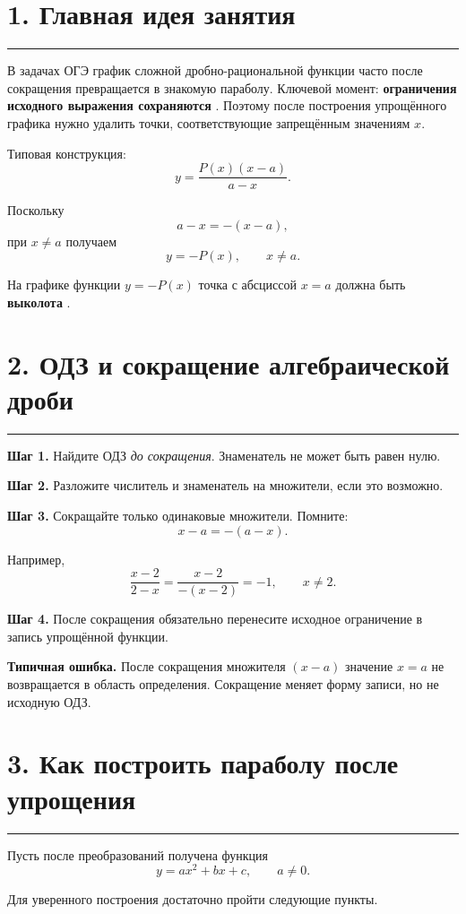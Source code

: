 \documentclass[a4paper,12pt]{article}
\newcommand{\sectionrule}{%
    \par
    \vspace{-0.4em}
    {\color{accent}\rule{\linewidth}{0.5pt}}
    \vspace{0.4em}
}
\newcommand{\key}[1]{%
    \textcolor{darkaccent}{\textbf{#1}}
}
\begin{document}
\section*{1. Главная идея занятия}
\sectionrule

В задачах ОГЭ график сложной дробно-рациональной функции часто после сокращения превращается в знакомую параболу. Ключевой момент: \key{ограничения исходного выражения сохраняются}. Поэтому после построения упрощённого графика нужно удалить точки, соответствующие запрещённым значениям $x$.

Типовая конструкция:
\[
y=\frac{P(x)(x-a)}{a-x}.
\]

Поскольку
\[
a-x=-(x-a),
\]
при $x\ne a$ получаем
\[
y=-P(x),
\qquad
x\ne a.
\]

На графике функции $y=-P(x)$ точка с абсциссой $x=a$ должна быть \key{выколота}.

\section*{2. ОДЗ и сокращение алгебраической дроби}
\sectionrule

\key{Шаг 1.} Найдите ОДЗ \emph{до сокращения}. Знаменатель не может быть равен нулю.

\key{Шаг 2.} Разложите числитель и знаменатель на множители, если это возможно.

\key{Шаг 3.} Сокращайте только одинаковые множители. Помните:
\[
x-a=-(a-x).
\]

Например,
\[
\frac{x-2}{2-x}
=
\frac{x-2}{-(x-2)}
=
-1,
\qquad
x\ne2.
\]

\key{Шаг 4.} После сокращения обязательно перенесите исходное ограничение в запись упрощённой функции.

\medskip

\textbf{Типичная ошибка.}
После сокращения множителя $(x-a)$ значение $x=a$ не возвращается в область определения. Сокращение меняет форму записи, но не исходную ОДЗ.

\section*{3. Как построить параболу после упрощения}
\sectionrule

Пусть после преобразований получена функция
\[
y=ax^2+bx+c,
\qquad
a\ne0.
\]

Для уверенного построения достаточно пройти следующие пункты.
\end{document}
